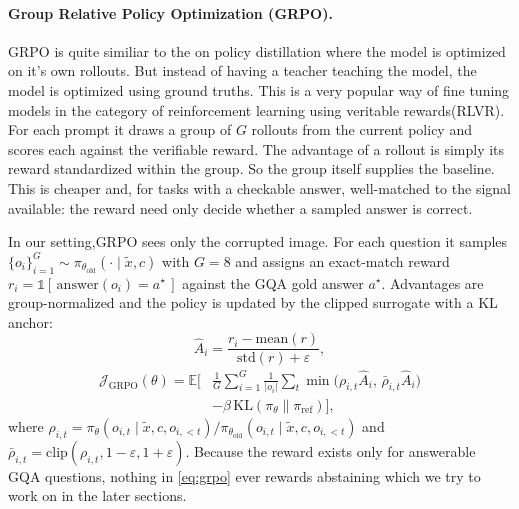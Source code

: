 \documentclass[10pt,twocolumn,letterpaper]{article}
\begin{document}
\paragraph{Group Relative Policy Optimization (GRPO).}
GRPO \citep{shao2024deepseekmathpushinglimitsmathematical} is quite similiar to the on policy distillation where the model is optimized on it's own rollouts. But instead of having a teacher teaching the model, the model is optimized using ground truths. This is a very popular way of fine tuning models in the category of reinforcement learning using veritable rewards(RLVR). For each prompt it draws a group of $G$ rollouts from the current policy and scores each against the verifiable reward. The advantage of a rollout is simply its reward standardized within the group. So the group itself supplies the baseline. This is cheaper and, for tasks with a checkable answer, well-matched to the signal available: the reward need only decide whether a sampled answer is correct.



In our setting,GRPO sees only the corrupted image. For each question it samples
$\{o_i\}_{i=1}^{G} \sim \pi_{\theta_{\mathrm{old}}}(\cdot \mid \tilde{x}, c)$ with $G{=}8$
and assigns an exact-match reward $r_i = \mathds{1}[\,\mathrm{answer}(o_i) = a^\star\,]$
against the GQA gold answer $a^\star$. Advantages are group-normalized and the policy is
updated by the clipped surrogate with a KL anchor:
\begin{equation}
\hat{A}_i = \frac{r_i - \mathrm{mean}(r)}{\mathrm{std}(r) + \varepsilon},
\label{eq:adv}
\end{equation}
\begin{equation}
\begin{aligned}
\mathcal{J}_{\mathrm{GRPO}}(\theta) = \mathbb{E}\Big[
&\frac{1}{G}\sum_{i=1}^{G}\frac{1}{|o_i|}\sum_t
\min\!\big(\rho_{i,t}\hat{A}_i,\, \bar\rho_{i,t}\hat{A}_i\big) \\
&- \beta\,\mathrm{KL}(\pi_\theta \| \pi_{\mathrm{ref}})\Big],
\end{aligned}
\label{eq:grpo}
\end{equation}
where $\rho_{i,t} = \pi_\theta(o_{i,t} \mid \tilde{x}, c, o_{i,<t}) /
\pi_{\theta_{\mathrm{old}}}(o_{i,t} \mid \tilde{x}, c, o_{i,<t})$ and
$\bar\rho_{i,t} = \mathrm{clip}(\rho_{i,t}, 1{-}\varepsilon, 1{+}\varepsilon)$. Because
the reward exists only for answerable GQA questions, nothing in \cref{eq:grpo} ever
rewards abstaining which we try to work on in the later sections.
\end{document}
